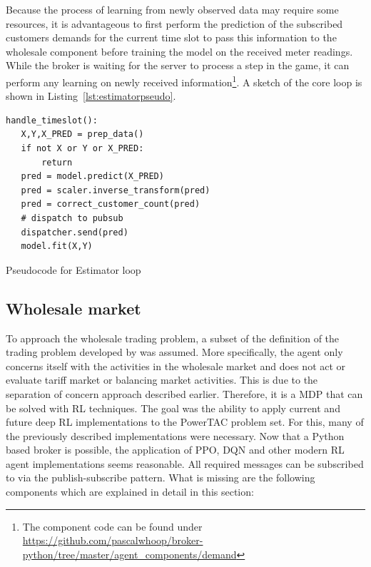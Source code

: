 Because the process of learning from newly observed data may require some resources, it is advantageous to
first perform the prediction of the subscribed customers demands for the current time slot to pass this information to
the wholesale component before training the model on the received meter readings. While the broker is waiting for the
server to process a step in the game, it can perform any learning on newly received information\footnote{The component code can be
found under \url{https://github.com/pascalwhoop/broker-python/tree/master/agent_components/demand}}. A sketch of the
core loop is shown in Listing~\ref{lst:estimatorpseudo}.

\begin{listing}
    \begin{verbatim}
handle_timeslot():
   X,Y,X_PRED = prep_data()
   if not X or Y or X_PRED:
       return
   pred = model.predict(X_PRED)
   pred = scaler.inverse_transform(pred)
   pred = correct_customer_count(pred)
   # dispatch to pubsub
   dispatcher.send(pred)
   model.fit(X,Y)
    \end{verbatim}
    \caption{Pseudocode for Estimator loop}
    \label{lst:estimatorpseudo}
\end{listing}




\subsection{Wholesale market}
\label{sec:wholesale_market}

To approach the wholesale trading problem, a subset of the definition of the trading problem developed by
\citet{tactexurieli2016mdp} was assumed. More specifically, the agent only concerns itself with the activities in the
wholesale market and does not act or evaluate tariff market or balancing market activities. This is due to the
separation of concern approach described earlier. Therefore, it is a \ac{MDP} that can be solved with \ac{RL} techniques.
The goal was the ability to apply current and future deep \ac{RL} implementations to the \ac{PowerTAC} problem set. For this,
many of the previously described implementations were necessary. Now that a Python based broker is possible, the application
of \ac{PPO}, \ac{DQN} and other modern \ac{RL} agent implementations seems reasonable. All required messages can be
subscribed to via the publish-subscribe pattern. What is missing are the following components which are explained in
detail in this section:


